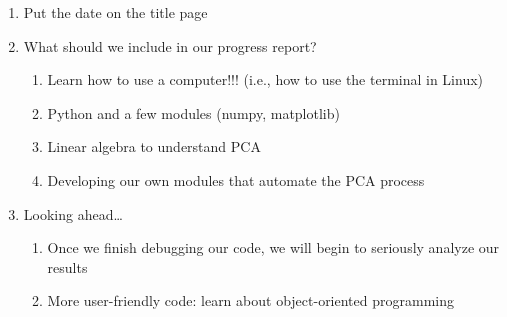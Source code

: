 \documentclass{article}
\begin{document}
\begin{enumerate}
\item Put the date on the title page
\item What should we include in our progress report?
  \begin{enumerate}
  \item Learn how to use a computer!!! (i.e., how to use the terminal in
    Linux)
  \item Python and a few modules (numpy, matplotlib)
  \item Linear algebra to understand PCA
  \item Developing our own modules that automate the PCA process
  \end{enumerate}
\item Looking ahead\ldots
  \begin{enumerate}
  \item Once we finish debugging our code, we will begin to seriously
    analyze our results
  \item More user-friendly code: learn about object-oriented
    programming
  \end{enumerate}

\end{enumerate}
\end{document}

